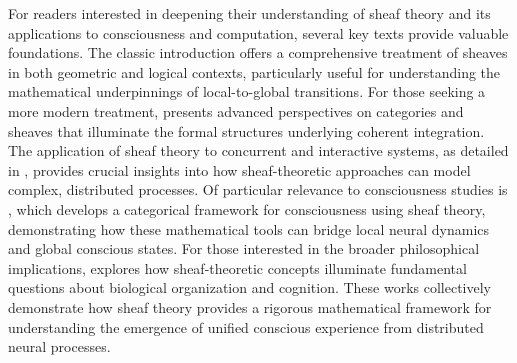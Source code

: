 For readers interested in deepening their understanding of sheaf theory and its applications to consciousness and computation, several key texts provide valuable foundations. The classic introduction \cite{MacLane1992} offers a comprehensive treatment of sheaves in both geometric and logical contexts, particularly useful for understanding the mathematical underpinnings of local-to-global transitions. For those seeking a more modern treatment, \cite{Kashiwara2005} presents advanced perspectives on categories and sheaves that illuminate the formal structures underlying coherent integration. The application of sheaf theory to concurrent and interactive systems, as detailed in \cite{Goguen1992}, provides crucial insights into how sheaf-theoretic approaches can model complex, distributed processes. Of particular relevance to consciousness studies is \cite{Rushworth2018}, which develops a categorical framework for consciousness using sheaf theory, demonstrating how these mathematical tools can bridge local neural dynamics and global conscious states. For those interested in the broader philosophical implications, \cite{Rosen1991} explores how sheaf-theoretic concepts illuminate fundamental questions about biological organization and cognition. These works collectively demonstrate how sheaf theory provides a rigorous mathematical framework for understanding the emergence of unified conscious experience from distributed neural processes.